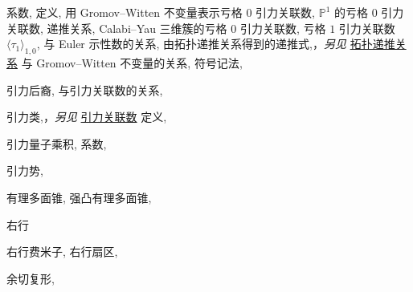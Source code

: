 \begin{theindex}
\subitem \leavevmode\hypertarget{idx:0466}{系数},\enspace{}
\subitem \leavevmode\hypertarget{idx:0467}{定义},\enspace{}
\subitem \leavevmode\hypertarget{idx:0468}{用 Gromov--Witten 不变量表示亏格 $0$ 引力关联数},\enspace{}
\subitem \leavevmode\hypertarget{idx:0469}{$\mathbb P^1$ 的亏格 $0$ 引力关联数},\enspace{}
\subsubitem \leavevmode\hypertarget{idx:0470}{递推关系},\enspace{}
\subitem \leavevmode\hypertarget{idx:0471}{Calabi--Yau 三维簇的亏格 $0$ 引力关联数},\enspace{}
\subitem \leavevmode\hypertarget{idx:0472}{亏格 $1$ 引力关联数 $\langle\tau_1\rangle_{1,0}$},\enspace{}
\subsubitem \leavevmode\hypertarget{idx:0473}{与 Euler 示性数的关系},\enspace{}
\subitem \leavevmode\hypertarget{idx:0474}{由拓扑递推关系得到的递推式},\enspace{}，\textit{另见} \hyperlink{idx:1344}{拓扑递推关系}
\subitem \leavevmode\hypertarget{idx:0475}{与 Gromov--Witten 不变量的关系},\enspace{}
\subitem \leavevmode\hypertarget{idx:0476}{符号记法},\enspace{}
\indexspace
\item \leavevmode\hypertarget{idx:0477}{引力后裔},\enspace{}
\subitem \leavevmode\hypertarget{idx:0478}{与引力关联数的关系},\enspace{}
\indexspace
\item \leavevmode\hypertarget{idx:0457}{引力类},\enspace{}，\textit{另见} \hyperlink{idx:0459}{引力关联数}
\subitem \leavevmode\hypertarget{idx:0458}{定义},\enspace{}
\indexspace
\item \leavevmode\hypertarget{idx:0481}{引力量子乘积},\enspace{}
\subitem \leavevmode\hypertarget{idx:0482}{系数},\enspace{}
\indexspace
\item \leavevmode\hypertarget{idx:0480}{引力势},\enspace{}
\indexspace
\item \leavevmode\hypertarget{idx:1205}{有理多面锥},\enspace{}
\subitem \leavevmode\hypertarget{idx:1206}{强凸有理多面锥},\enspace{}
\indexspace
\item \leavevmode\hypertarget{idx:1234}{右行}
\subitem \leavevmode\hypertarget{idx:1235}{右行费米子},\enspace{}
\subitem \leavevmode\hypertarget{idx:1236}{右行扇区},\enspace{}
\indexspace
\item \leavevmode\hypertarget{idx:0197}{余切复形},\enspace{}

\end{theindex}
